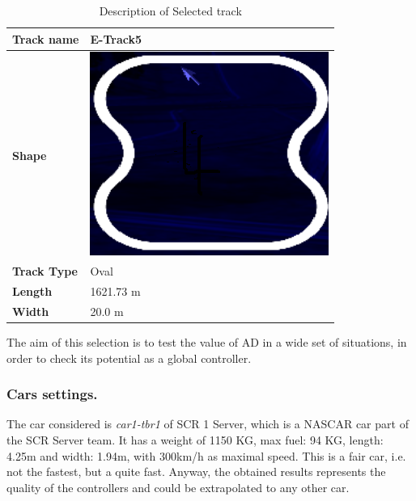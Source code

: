 \documentclass[runningheads,a4paper]{llncs}
\begin{document}
	\begin{table}
		
		\caption{Description of Selected track}
		\label{Tabtrack}
		\begin{tabular}{ |p{2cm}|p{2.2 cm}|}
			\hline
			\textbf{Track name}    & E-Track5	\\
			\hline
			\textbf{Shape}   
			& \includegraphics[scale=0.3]{fig/track4.png}			
			\\
			\hline
			\textbf{Track Type}   
			& Oval
			\\
			\hline
			
			\textbf{Length}   
			& 1621.73 m	\\
			\hline
			\textbf{Width}   
			& 20.0 m\\
			\hline
		\end{tabular} 
		
	\end{table}
	
	The aim of this selection is to test the value of AD in a wide set of situations, in order to check its potential as a global controller.
	
	
	
	\subsubsection{Cars settings.}
	
	The car considered is \textit{car1-tbr1} of SCR 1 Server, which is a NASCAR car part of the SCR Server team. It has a weight of 1150 KG, max fuel: 94 KG, length: 4.25m and width: 1.94m, with 300km/h as maximal speed.
	This is a fair car, i.e. not the fastest, but a quite fast. Anyway, the obtained results represents the quality of the controllers and could be extrapolated to any other car.
	
	
\end{document}
